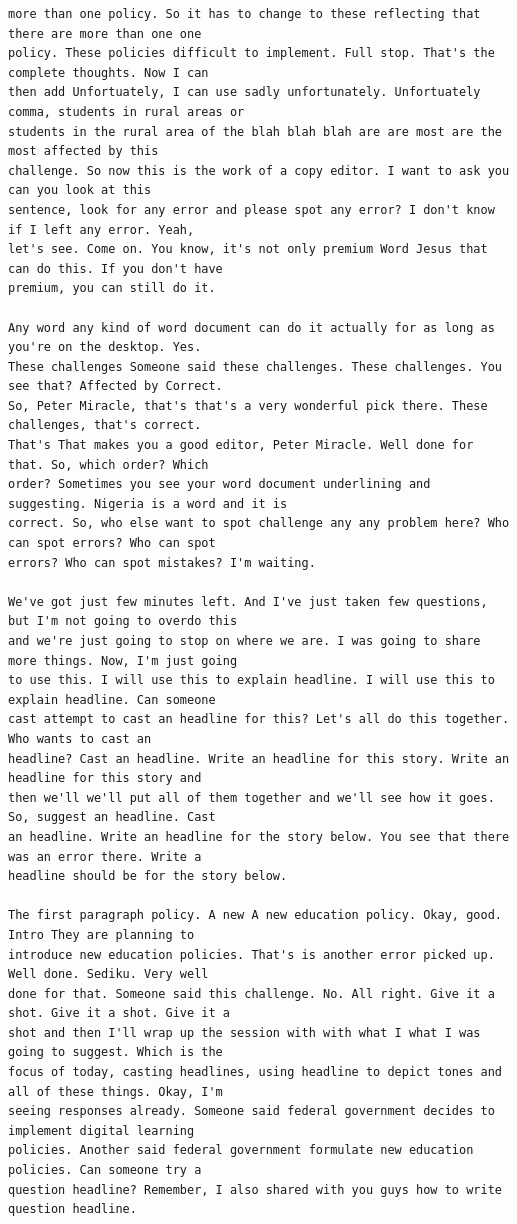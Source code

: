 {\begin{Verbatim}
more than one policy. So it has to change to these reflecting that there are more than one one
policy. These policies difficult to implement. Full stop. That's the complete thoughts. Now I can
then add Unfortuately, I can use sadly unfortunately. Unfortuately comma, students in rural areas or
students in the rural area of the blah blah blah are are most are the most affected by this
challenge. So now this is the work of a copy editor. I want to ask you can you look at this
sentence, look for any error and please spot any error? I don't know if I left any error. Yeah,
let's see. Come on. You know, it's not only premium Word Jesus that can do this. If you don't have
premium, you can still do it.

Any word any kind of word document can do it actually for as long as you're on the desktop. Yes.
These challenges Someone said these challenges. These challenges. You see that? Affected by Correct.
So, Peter Miracle, that's that's a very wonderful pick there. These challenges, that's correct.
That's That makes you a good editor, Peter Miracle. Well done for that. So, which order? Which
order? Sometimes you see your word document underlining and suggesting. Nigeria is a word and it is
correct. So, who else want to spot challenge any any problem here? Who can spot errors? Who can spot
errors? Who can spot mistakes? I'm waiting.

We've got just few minutes left. And I've just taken few questions, but I'm not going to overdo this
and we're just going to stop on where we are. I was going to share more things. Now, I'm just going
to use this. I will use this to explain headline. I will use this to explain headline. Can someone
cast attempt to cast an headline for this? Let's all do this together. Who wants to cast an
headline? Cast an headline. Write an headline for this story. Write an headline for this story and
then we'll we'll put all of them together and we'll see how it goes. So, suggest an headline. Cast
an headline. Write an headline for the story below. You see that there was an error there. Write a
headline should be for the story below.

The first paragraph policy. A new A new education policy. Okay, good. Intro They are planning to
introduce new education policies. That's is another error picked up. Well done. Sediku. Very well
done for that. Someone said this challenge. No. All right. Give it a shot. Give it a shot. Give it a
shot and then I'll wrap up the session with with what I what I was going to suggest. Which is the
focus of today, casting headlines, using headline to depict tones and all of these things. Okay, I'm
seeing responses already. Someone said federal government decides to implement digital learning
policies. Another said federal government formulate new education policies. Can someone try a
question headline? Remember, I also shared with you guys how to write question headline.


\end{Verbatim}}
